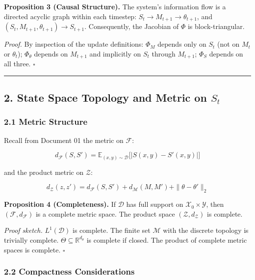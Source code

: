 \documentclass[
  12pt,
]{article}
\begin{document}
\textbf{Proposition 3 (Causal Structure).} The system's information flow
is a directed acyclic graph within each timestep:
\(S_t \to M_{t+1} \to \theta_{t+1}\), and
\((S_t, M_{t+1}, \theta_{t+1}) \to S_{t+1}\). Consequently, the Jacobian
of \(\Phi\) is block-triangular.

\emph{Proof.} By inspection of the update definitions: \(\Phi_M\)
depends only on \(S_t\) (not on \(M_t\) or \(\theta_t\));
\(\Phi_\theta\) depends on \(M_{t+1}\) and implicitly on \(S_t\) through
\(M_{t+1}\); \(\Phi_S\) depends on all three. \(\square\)

\begin{center}\rule{0.5\linewidth}{0.5pt}\end{center}

\subsection{\texorpdfstring{2. State Space Topology and Metric on
\(S_t\)}{2. State Space Topology and Metric on S\_t}}\label{state-space-topology-and-metric-on-s_t}

\subsubsection{2.1 Metric Structure}\label{metric-structure}

Recall from Document 01 the metric on \(\mathcal{F}\):

\[d_{\mathcal{F}}(S, S') = \mathbb{E}_{(x,y) \sim \mathcal{D}}\bigl[ |S(x,y) - S'(x,y)| \bigr]\]

and the product metric on \(\mathcal{Z}\):

\[d_{\mathcal{Z}}(z, z') = d_{\mathcal{F}}(S, S') + d_{\mathcal{M}}(M, M') + \|\theta - \theta'\|_2\]

\textbf{Proposition 4 (Completeness).} If \(\mathcal{D}\) has full
support on \(\mathcal{X}_0 \times \mathcal{Y}\), then
\((\mathcal{F}, d_{\mathcal{F}})\) is a complete metric space. The
product space \((\mathcal{Z}, d_{\mathcal{Z}})\) is complete.

\emph{Proof sketch.} \(L^1(\mathcal{D})\) is complete. The finite set
\(\mathcal{M}\) with the discrete topology is trivially complete.
\(\Theta \subseteq \mathbb{R}^{d_\theta}\) is complete if closed. The
product of complete metric spaces is complete. \(\square\)

\subsubsection{2.2 Compactness
Considerations}\label{compactness-considerations}
\end{document}
